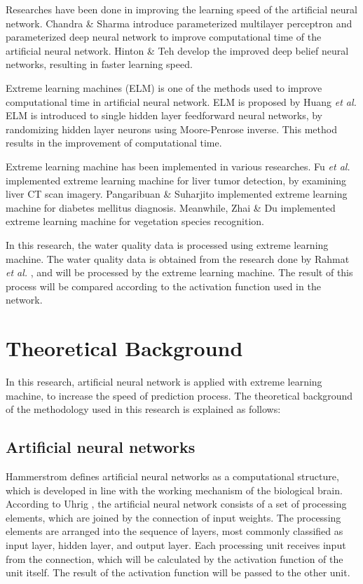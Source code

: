 \documentclass[journal,comsoc]{IEEEtran}
\begin{document}
Researches have been done in improving the learning speed of the artificial neural network. Chandra \& Sharma introduce parameterized multilayer perceptron \cite{Chandra14} and parameterized deep neural network \cite{Chandra16} to improve computational time of the artificial neural network. Hinton \& Teh \cite{Hinton06} develop the improved deep belief neural networks, resulting in faster learning speed.

Extreme learning machines (ELM) is one of the methods used to improve computational time in artificial neural network. ELM is proposed by Huang \textit{et al.} \cite{Huang06} ELM is introduced to single hidden layer feedforward neural networks, by randomizing hidden layer neurons using Moore-Penrose inverse. This method results in the improvement of computational time.

Extreme learning machine has been implemented in various researches. Fu \textit{et al.} \cite{Fu15} implemented extreme learning machine for liver tumor detection, by examining liver CT scan imagery. Pangaribuan \& Suharjito \cite{Pangaribuan14} implemented extreme learning machine for diabetes mellitus diagnosis. Meanwhile, Zhai \& Du \cite{Zhai08} implemented extreme learning machine for vegetation species recognition.

In this research, the water quality data is processed using extreme learning machine. The water quality data is obtained from the research done by Rahmat \textit{et al.} \cite{Rahmat16}, and will be processed by the extreme learning machine. The result of this process will be compared according to the activation function used in the network.

\section{Theoretical Background}

In this research, artificial neural network is applied with extreme learning machine, to increase the speed of prediction process. The theoretical background of the methodology used in this research is explained as follows:

\subsection{Artificial neural networks}

Hammerstrom \cite{Hammerstrom93} defines artificial neural networks as a computational structure, which is developed in line with the working mechanism of the biological brain. According to Uhrig \cite{Uhrig95}, the artificial neural network consists of a set of processing elements, which are joined by the connection of input weights. The processing elements are arranged into the sequence of layers, most commonly classified as input layer, hidden layer, and output layer. Each processing unit receives input from the connection, which will be calculated by the activation function of the unit itself. The result of the activation function will be passed to the other unit.
\end{document}
